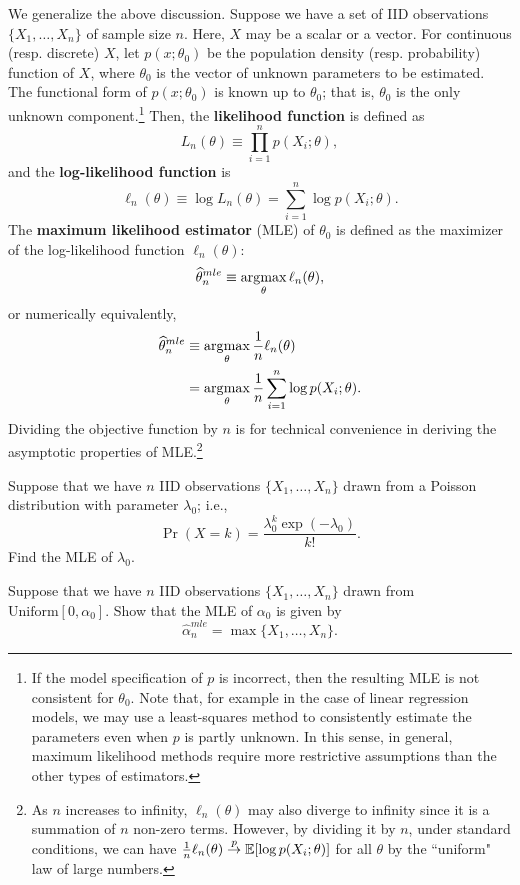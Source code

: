 \documentclass[11pt, A4paper, openany, uplatex]{book}
\begin{document}
We generalize the above discussion.
Suppose we have a set of IID observations $\{X_1, \ldots, X_n\}$ of sample size $n$.
Here, $X$ may be a scalar or a vector.
For continuous (resp. discrete) $X$, let $p(x ; \theta_0)$ be the population density (resp. probability) function of $X$, where $\theta_0$ is the vector of unknown parameters to be estimated.
The functional form of $p(x ; \theta_0)$ is known up to $\theta_0$; that is, $\theta_0$ is the only unknown component.\footnote{
	If the model specification of $p$ is incorrect, then the resulting MLE is not consistent for $\theta_0$.
	Note that, for example in the case of linear regression models, we may use a least-squares method to consistently estimate the parameters even when $p$ is partly unknown.
	In this sense, in general, maximum likelihood methods require more restrictive assumptions than the other types of estimators.
	}
Then, the \textbf{likelihood function} is defined as
\[
	L_n(\theta) \equiv \prod_{i = 1}^n p(X_i; \theta),
\]
and the \textbf{log-likelihood function} is
\[
	\ell_n(\theta) \equiv \log L_n(\theta) = \sum_{i = 1}^n \log p(X_i; \theta).
\]
The \textbf{maximum likelihood estimator} (MLE) of $\theta_0$ is defined as the maximizer of the log-likelihood function $\ell_n(\theta)$: 
\[
	\widehat \theta_n^{mle} \equiv \operatorname*{\arg\!\max}_{\theta}\ell_n(\theta),
\]
or numerically equivalently,
\begin{align*}
	\widehat \theta_n^{mle} 
	& \equiv \operatorname*{\arg\!\max}_{\theta} \frac{1}{n} \ell_n(\theta) \\ 
	& = \operatorname*{\arg\!\max}_{\theta} \frac{1}{n} \sum_{i = 1}^n \log p(X_i; \theta).
\end{align*}
Dividing the objective function by $n$ is for technical convenience in deriving the asymptotic properties of MLE.\footnote{
	As $n$ increases to infinity, $\ell_n(\theta)$ may also diverge to infinity since it is a summation of $n$ non-zero terms.
	However, by dividing it by $n$, under standard conditions, we can have $\frac{1}{n} \ell_n(\theta) \overset{p}{\to} \mathbb{E}[\log p(X_i; \theta)]$ for all $\theta$ by the ``uniform" law of large numbers.\label{foot:UWLLN}
	}

\begin{framed}
\begin{exercise}\upshape
	Suppose that we have $n$ IID observations $\{X_1, \ldots, X_n\}$ drawn from a Poisson distribution with parameter $\lambda_0$; i.e.,
	\[
		\Pr(X = k) = \frac{\lambda_0^k \exp(-\lambda_0)}{k !}.
	\]
	Find the MLE of $\lambda_0$.
\end{exercise}
\begin{exercise}\label{ex:maxuni}\upshape
	Suppose that we have $n$ IID observations $\{X_1, \ldots, X_n\}$ drawn from $\text{Uniform}[0, \alpha_0]$.
	Show that the MLE of $\alpha_0$ is given by 
	\[
	\hat \alpha_n^{mle} = \max\{X_1, \ldots, X_n\}. 
	\] 
\end{exercise}
\end{framed}
\end{document}
